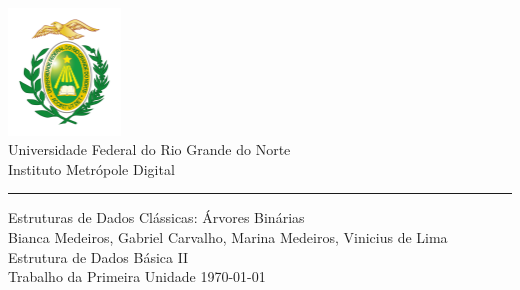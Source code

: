 \documentclass[a4paper,11pt,oneside]{book}
\begin{document}

\frontmatter

\begin{titlepage}
	\begin{center}
		\includegraphics[width=3cm]{figures/ufrnlogo.png}\\[0.5cm]
		{\LARGE Universidade Federal do Rio Grande do Norte\\[0.5cm]
		Instituto Metrópole Digital}\\[2cm]
		{\color{blue} \rule{\textwidth}{1pt}}
		\linespread{1.2}\huge {
			Estruturas de Dados Clássicas: Árvores Binárias
		}
		\linespread{1}~\\[2cm]
		{\Large
		Bianca Medeiros,
		Gabriel Carvalho,
		Marina Medeiros,
		Vinicius de Lima
		}\\[1cm]

		{\large
		\emph{} Estrutura de Dados Básica II}\\[1cm] %

		\large Trabalho da Primeira Unidade
		\vfill
		\today
	\end{center}
\end{titlepage}


\tableofcontents

\mainmatter







\nocite{*}
\end{document}
